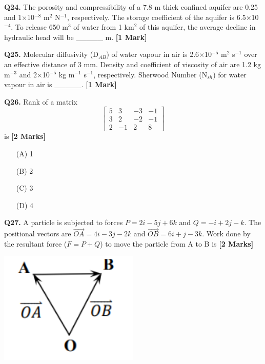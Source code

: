 \documentclass[11pt]{article}
\newcommand{\questiona}[2]{
    \noindent\textbf{Q#2.} #1 \hfill \textbf{[1 Mark]}
}
\newcommand{\questionb}[2]{
    \noindent\textbf{Q#2.} #1 \hfill \textbf{[2 Marks]}
}
\begin{document}
\questiona{The porosity and compressibility of a 7.8 m thick confined aquifer are 0.25 and 1×10\(^{-8}\) m\(^{2}\) N\(^{-1}\), respectively. The storage coefficient of the aquifer is 6.5×10\(^{-4}\). To release 650 m\(^{3}\) of water from 1 km\(^{2}\) of this aquifer, the average decline in hydraulic head will be \_\_\_\_\_ m.}{24}
\vspace{0.5cm}

\questiona{Molecular diffusivity (D\(_{AB}\)) of water vapour in air is 2.6×10\(^{-5}\) m\(^{2}\) s\(^{-1}\) over an effective distance of 3 mm. Density and coefficient of viscosity of air are 1.2 kg m\(^{-3}\) and 2×10\(^{-5}\) kg m\(^{-1}\) s\(^{-1}\), respectively. Sherwood Number (N\(_{sh}\)) for water vapour in air is \_\_\_\_\_.}{25}
\vspace{0.5cm}

\questionb{Rank of a matrix 
\[
\begin{bmatrix}
5 & 3 & -3 & -1 \\
3 & 2 & -2 & -1 \\
2 & -1 & 2 & 8
\end{bmatrix}
\] is}{26}
\begin{enumerate}
    \item[(A)] 1  
    \item[(B)] 2  
    \item[(C)] 3  
    \item[(D)] 4  
\end{enumerate}
\vspace{0.5cm}

\questionb{A particle is subjected to forces \( P = 2i - 5j + 6k \) and \( Q = -i + 2j - k \). The positional vectors are \( \vec{OA} = 4i - 3j - 2k \) and \( \vec{OB} = 6i + j - 3k \). Work done by the resultant force (\( F = P + Q \)) to move the particle from A to B is}{27}
\begin{center}
\includegraphics[width=0.5\textwidth]{figures/27.png}
\end{center}
\end{document}
